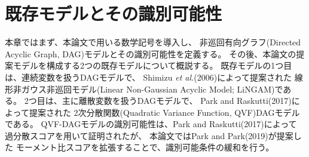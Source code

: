 
\section{既存モデルとその識別可能性}
\label{part:model}

本章ではまず、本論文で用いる数学記号を導入し、
非巡回有向グラフ(Directed Acyclic Graph, DAG)モデルとその識別可能性を定義する。
その後、本論文の提案モデルを構成する2つの既存モデルについて概説する。
既存モデルの1つ目は、連続変数を扱うDAGモデルで、
Shimizu \textit{et al.}(2006)\cite{Shimizu2006-yu}によって提案された
線形非ガウス非巡回モデル(Linear Non-Gaussian Acyclic Model; LiNGAM)である。
2つ目は、主に離散変数を扱うDAGモデルで、
Park and Raskutti(2017)\cite{Park2017-hw}によって提案された
2次分散関数(Quadratic Variance Function, QVF)DAGモデルである。
QVF-DAGモデルの識別可能性は、Park and Raskutti(2017)\cite{Park2017-hw}によって
過分散スコアを用いて証明されたが、
本論文ではPark and Park(2019)\cite{Park2019-qy}が提案した
モーメント比スコアを拡張することで、識別可能条件の緩和を行う。


%

%

%

%

